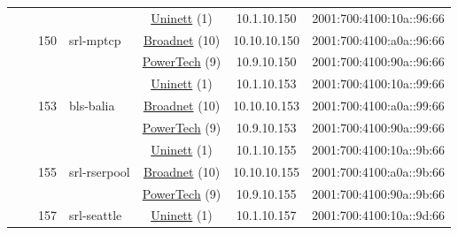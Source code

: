 \begin{small}
\begin{center}
\begin{longtable}{|c|c|c|c|c|c|c|c|}
  &  & \multirow{3}{*}{\tiny{150}} & \multicolumn{1}{|l|}{\multirow{3}{*}{\tiny{srl-mptcp}}} & \multicolumn{2}{|c|}{\tiny{\href{https://www.uninett.no}{Uninett} (1)}} & \tiny{10.1.10.150} & \tiny{2001:700:4100:10a::96:66} \\* \cline{5-5}\cline{6-6}\cline{7-7}\cline{8-8}
  &  &  &  & \multicolumn{2}{|c|}{\tiny{\href{https://www.broadnet.no}{Broadnet} (10)}} & \tiny{10.10.10.150} & \tiny{2001:700:4100:a0a::96:66} \\* \cline{5-5}\cline{6-6}\cline{7-7}\cline{8-8}
  &  &  &  & \multicolumn{2}{|c|}{\tiny{\href{http://www.powertech.no}{PowerTech} (9)}} & \tiny{10.9.10.150} & \tiny{2001:700:4100:90a::96:66} \\* \cline{3-3}\cline{4-4}\cline{5-5}\cline{6-6}\cline{7-7}\cline{8-8}
  &  & \multirow{3}{*}{\tiny{153}} & \multicolumn{1}{|l|}{\multirow{3}{*}{\tiny{bls-balia}}} & \multicolumn{2}{|c|}{\tiny{\href{https://www.uninett.no}{Uninett} (1)}} & \tiny{10.1.10.153} & \tiny{2001:700:4100:10a::99:66} \\* \cline{5-5}\cline{6-6}\cline{7-7}\cline{8-8}
  &  &  &  & \multicolumn{2}{|c|}{\tiny{\href{https://www.broadnet.no}{Broadnet} (10)}} & \tiny{10.10.10.153} & \tiny{2001:700:4100:a0a::99:66} \\* \cline{5-5}\cline{6-6}\cline{7-7}\cline{8-8}
  &  &  &  & \multicolumn{2}{|c|}{\tiny{\href{http://www.powertech.no}{PowerTech} (9)}} & \tiny{10.9.10.153} & \tiny{2001:700:4100:90a::99:66} \\* \cline{3-3}\cline{4-4}\cline{5-5}\cline{6-6}\cline{7-7}\cline{8-8}
  &  & \multirow{3}{*}{\tiny{155}} & \multicolumn{1}{|l|}{\multirow{3}{*}{\tiny{srl-rserpool}}} & \multicolumn{2}{|c|}{\tiny{\href{https://www.uninett.no}{Uninett} (1)}} & \tiny{10.1.10.155} & \tiny{2001:700:4100:10a::9b:66} \\* \cline{5-5}\cline{6-6}\cline{7-7}\cline{8-8}
  &  &  &  & \multicolumn{2}{|c|}{\tiny{\href{https://www.broadnet.no}{Broadnet} (10)}} & \tiny{10.10.10.155} & \tiny{2001:700:4100:a0a::9b:66} \\* \cline{5-5}\cline{6-6}\cline{7-7}\cline{8-8}
  &  &  &  & \multicolumn{2}{|c|}{\tiny{\href{http://www.powertech.no}{PowerTech} (9)}} & \tiny{10.9.10.155} & \tiny{2001:700:4100:90a::9b:66} \\* \cline{3-3}\cline{4-4}\cline{5-5}\cline{6-6}\cline{7-7}\cline{8-8}
  &  & \multirow{3}{*}{\tiny{157}} & \multicolumn{1}{|l|}{\multirow{3}{*}{\tiny{srl-seattle}}} & \multicolumn{2}{|c|}{\tiny{\href{https://www.uninett.no}{Uninett} (1)}} & \tiny{10.1.10.157} & \tiny{2001:700:4100:10a::9d:66} \\* \cline{5-5}\cline{6-6}\cline{7-7}\cline{8-8}

\end{longtable}
\end{center}
\end{small}
